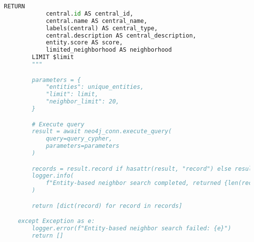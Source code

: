\begin{lstlisting}[numbers=none, language=python]
        RETURN
            central.id AS central_id,
            central.name AS central_name,
            labels(central) AS central_type,
            central.description AS central_description,
            entity.score AS score,
            limited_neighborhood AS neighborhood
        LIMIT $limit
        """

        parameters = {
            "entities": unique_entities,
            "limit": limit,
            "neighbor_limit": 20,
        }

        # Execute query
        result = await neo4j_conn.execute_query(
            query=query_cypher,
            parameters=parameters
        )

        records = result.record if hasattr(result, "record") else result
        logger.info(
            f"Entity-based neighbor search completed, returned {len(records)} results"
        )

        return [dict(record) for record in records]

    except Exception as e:
        logger.error(f"Entity-based neighbor search failed: {e}")
        return []

\end{lstlisting}
